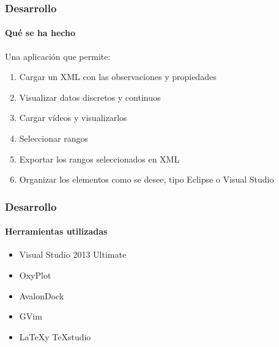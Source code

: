 \begin{frame}
	\frametitle{Desarrollo}
	\framesubtitle{Qu\'e se ha hecho}
	Una aplicaci\'on que permite:
	\begin{enumerate}
		\item Cargar un XML con las observaciones y propiedades
		\item Visualizar datos discretos y continuos
		\item Cargar v\'ideos y visualizarlos
		\item Seleccionar rangos
		\item Exportar los rangos seleccionados en XML
		\item Organizar los elementos como se desee, tipo Eclipse o Visual 
		Studio
	\end{enumerate}
	
\end{frame}

\begin{frame}
	\frametitle{Desarrollo}
	\framesubtitle{Herramientas utilizadas}
	
	\begin{itemize}
		\item Visual Studio 2013 Ultimate
		\item OxyPlot
		\item AvalonDock
		\item GVim
		\item \LaTeX y TeXstudio
	\end{itemize}
\end{frame}